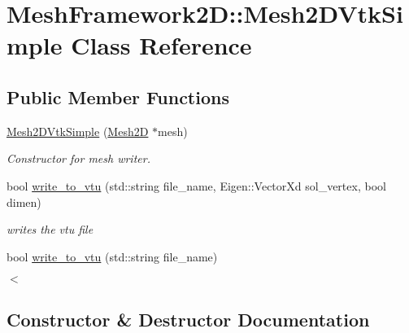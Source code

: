 \hypertarget{classMeshFramework2D_1_1Mesh2DVtkSimple}{}\section{Mesh\+Framework2D\+:\+:Mesh2\+D\+Vtk\+Simple Class Reference}
\label{classMeshFramework2D_1_1Mesh2DVtkSimple}
\subsection*{Public Member Functions}
\begin{DoxyCompactItemize}
\item 
\hyperlink{classMeshFramework2D_1_1Mesh2DVtkSimple_a3a16a0d2bf01f39b4fb7297d7c525a64}{Mesh2\+D\+Vtk\+Simple} (\hyperlink{classMeshFramework2D_1_1Mesh2D}{Mesh2D} $\ast$mesh)
\begin{DoxyCompactList}\small\item\em Constructor for mesh writer. \end{DoxyCompactList}\item 
bool \hyperlink{classMeshFramework2D_1_1Mesh2DVtkSimple_ad26d743f8c0a3ee17f7c4e62d5cdffbd}{write\+\_\+to\+\_\+vtu} (std\+::string file\+\_\+name, Eigen\+::\+Vector\+Xd sol\+\_\+vertex, bool dimen)
\begin{DoxyCompactList}\small\item\em writes the vtu file \end{DoxyCompactList}\item 
bool \hyperlink{classMeshFramework2D_1_1Mesh2DVtkSimple_af2037ed3bd30ee7823ce4e8d5f9bfbe1}{write\+\_\+to\+\_\+vtu} (std\+::string file\+\_\+name)
\begin{DoxyCompactList}\small\item\em $<$ \end{DoxyCompactList}\end{DoxyCompactItemize}


\subsection{Constructor \& Destructor Documentation}
\mbox{\label{classMeshFramework2D_1_1Mesh2DVtkSimple_a3a16a0d2bf01f39b4fb7297d7c525a64}} 
